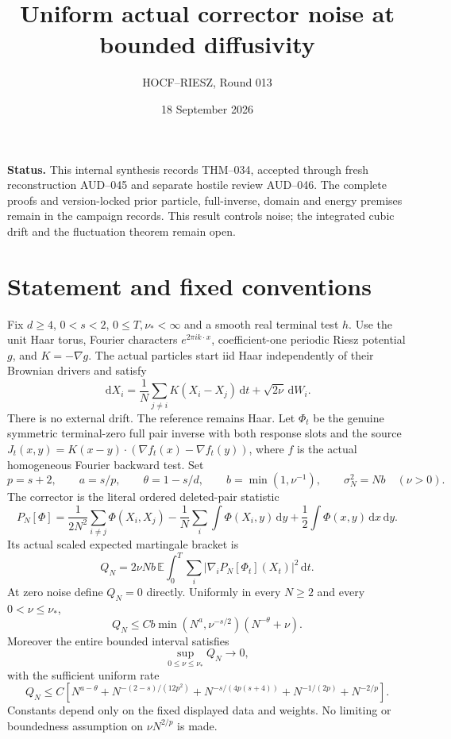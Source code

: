 \documentclass[10pt]{article}
\title{Uniform actual corrector noise at bounded diffusivity}
\author{HOCF--RIESZ, Round 013}
\date{18 September 2026}
\newcommand{\E}{\mathbb E}
\newcommand{\dd}{\,\mathrm d}
\begin{document}
\maketitle
\noindent\textbf{Status.} This internal synthesis records THM--034, accepted
through fresh reconstruction AUD--045 and separate hostile review AUD--046.
The complete proofs and version-locked prior particle, full-inverse, domain
and energy premises remain in the campaign records. This result controls
noise; the integrated cubic drift and the fluctuation theorem remain open.

\section*{Statement and fixed conventions}
Fix $d\ge4$, $0<s<2$, $0\le T,\nu_*<\infty$ and a smooth real terminal test
$h$. Use the unit Haar torus, Fourier characters $e^{2\pi i k\cdot x}$,
coefficient-one periodic Riesz potential $g$, and $K=-\nabla g$. The actual
particles start iid Haar independently of their Brownian drivers and satisfy
\[
 \dd X_i=\frac1N\sum_{j\ne i}K(X_i-X_j)\dd t+\sqrt{2\nu}\dd W_i.
\]
There is no external drift. The reference remains Haar. Let $\Phi_t$ be the
genuine symmetric terminal-zero full pair inverse with both response slots
and the source $J_t(x,y)=K(x-y)\cdot(\nabla f_t(x)-\nabla f_t(y))$, where
$f$ is the actual homogeneous Fourier backward test. Set
\[
 p=s+2,\qquad a=s/p,\qquad\theta=1-s/d,\qquad
 b=\min(1,\nu^{-1}),\qquad\sigma_N^2=Nb\quad(\nu>0).
\]
The corrector is the literal ordered deleted-pair statistic
\[
 P_N[\Phi]=\frac1{2N^2}\sum_{i\ne j}\Phi(X_i,X_j)
 -\frac1N\sum_i\int\Phi(X_i,y)\dd y+\frac12\int\Phi(x,y)\dd x\dd y.
\]
Its actual scaled expected martingale bracket is
\[
 Q_N=2\nu Nb\,\E\int_0^T\sum_i|\nabla_iP_N[\Phi_t](X_t)|^2\dd t.
\]
At zero noise define $Q_N=0$ directly. Uniformly in every $N\ge2$ and every
$0<\nu\le\nu_*$,
\[
 Q_N\le Cb\min(N^a,\nu^{-s/2})(N^{-\theta}+\nu).
\]
Moreover the entire bounded interval satisfies
\[
 \sup_{0\le\nu\le\nu_*}Q_N\longrightarrow0,
\]
with the sufficient uniform rate
\[
 Q_N\le C\left[N^{a-\theta}+N^{-(2-s)/(12p^2)}
 +N^{-s/(4p(s+4))}+N^{-1/(2p)}+N^{-2/p}\right].
\]
Constants depend only on the fixed displayed data and weights. No limiting
or boundedness assumption on $\nu N^{2/p}$ is made.

\newpage
\end{document}
